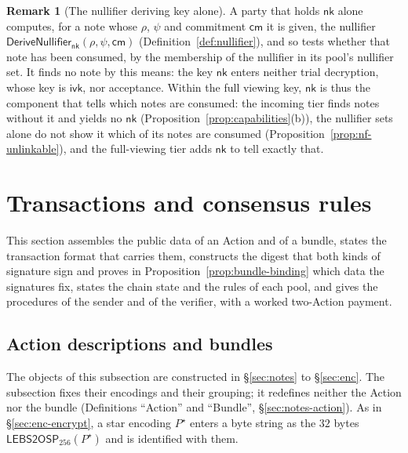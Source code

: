 \documentclass[11pt,a4paper]{article}
\theoremstyle{definition}
\newtheorem{remark}[theorem]{Remark}
\newcommand{\cmsym}{\mathsf{cm}}
\newcommand{\nksym}{\ensuremath{\mathsf{nk}}}
\newcommand{\ivk}{\ensuremath{\mathsf{ivk}}}
\begin{document}
\begin{remark}[The nullifier deriving key alone]
A party that holds $\nksym$ alone computes, for a note whose $\rho$, $\psi$
and commitment $\cmsym$ it is given, the nullifier
$\mathsf{DeriveNullifier}_{\nksym}(\rho, \psi, \cmsym)$
(Definition~\ref{def:nullifier}), and so tests whether that note has been
consumed, by the membership of the nullifier in its pool's nullifier set.
It finds no note by this means: the key $\nksym$ enters neither trial
decryption, whose key is $\ivk$, nor acceptance. Within the full viewing
key, $\nksym$ is thus the component that tells which notes are consumed: the
incoming tier finds notes without it and yields no $\nksym$
(Proposition~\ref{prop:capabilities}(b)), the nullifier sets alone do not
show it which of its notes are consumed
(Proposition~\ref{prop:nf-unlinkable}), and the full-viewing tier adds
$\nksym$ to tell exactly that.
\end{remark}

\section{Transactions and consensus rules}\label{sec:tx}

This section assembles the public data of an Action and of a bundle, states
the transaction format that carries them, constructs the digest that both
kinds of signature sign and proves in Proposition~\ref{prop:bundle-binding}
which data the signatures fix, states the chain state and the rules of each
pool, and gives the procedures of the sender and of the verifier, with a
worked two-Action payment.

\subsection{Action descriptions and bundles}\label{sec:tx-bundle}

The objects of this subsection are constructed in \S\ref{sec:notes} to
\S\ref{sec:enc}. The subsection fixes their encodings and their grouping; it
redefines neither the Action nor the bundle (Definitions ``Action'' and
``Bundle'', \S\ref{sec:notes-action}). As in \S\ref{sec:enc-encrypt}, a star
encoding $P^{\star}$ enters a byte string as the $32$ bytes
$\mathsf{LEBS2OSP}_{256}(P^{\star})$ and is identified with them.
\end{document}

